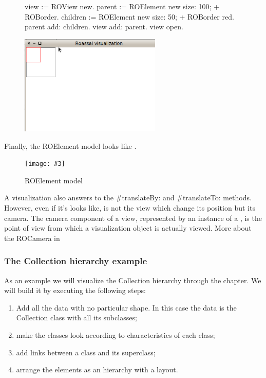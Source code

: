 \documentclass[a4paper,10pt,twoside]{book}
\newcommand{\fig}[4]{
		\begin{figure}[#1]
			\centering
			\texttt{[image: \#3]}
			\caption{\label{fig:#3}#4}
		\end{figure}}
\begin{document}
\begin{figure}[H]
      \begin{minipage}[t]{0.5\textwidth}
      \vspace{0pt}
\begin{code}{}
view := ROView new.
parent := ROElement new 
				size: 100;
				+ ROBorder.
children := ROElement new 
				size: 50;
				+ ROBorder red.
parent add: children.
view add: parent.
view open.
\end{code}
   \end{minipage}
   \hfill
   \begin{minipage}[t]{0.6\textwidth}
      \vspace{0pt} \raggedright
       \centering
		\includegraphics[width=0.6\textwidth]{ex5}
   \end{minipage}
\label{fig:ex5}
\end{figure}

Finally, the ROElement model looks like .

\fig{H}{0.5}{ROElementModel}{ROElement model}

A visualization also answers to the \#translateBy: and \#translateTo: methods. However, even if it's looks like, is not the view which change its position but its camera. The camera component of a view, represented by an instance of a , is the point of view from which a visualization object is actually viewed. More about the ROCamera in 

\subsubsection*{The Collection hierarchy example}
As an example we will visualize the Collection hierarchy through the chapter. We will build it by executing the following steps:
\begin{enumerate}
\item Add all the data with no particular shape. In this case the data is the Collection class with all its subclasses;
\item make the classes look according to characteristics of each class;
\item add links between a class and its superclass;
\item arrange the elements as an hierarchy with a layout.
\end{enumerate}
\end{document}
